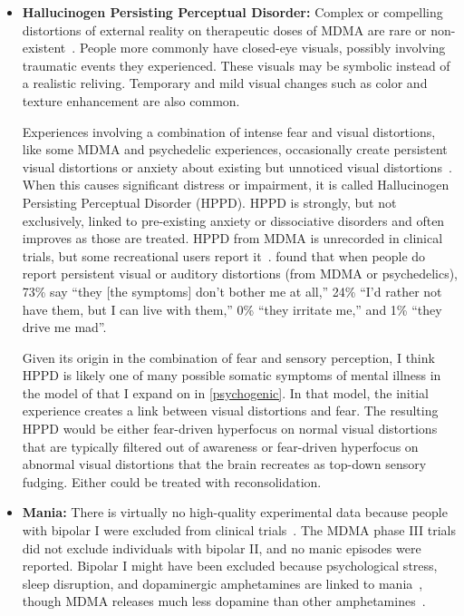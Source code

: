 \documentclass[11pt,oneside]{book}
\let\cite\parencite
\begin{document}
\begin{itemize}
    \item \textbf{Hallucinogen Persisting Perceptual Disorder:} Complex or compelling distortions of external reality on therapeutic doses of MDMA are rare or non-existent~\cite{liechtiGender}. People more commonly have closed-eye visuals, possibly involving traumatic events they experienced. These visuals may be symbolic instead of a realistic reliving. Temporary and mild visual changes such as color and texture enhancement are also common.

    Experiences involving a combination of intense fear and visual distortions, like some MDMA and psychedelic experiences, occasionally create persistent visual distortions or anxiety about existing but unnoticed visual distortions~\cite{halpernHPPD}. When this causes significant distress or impairment, it is called Hallucinogen Persisting Perceptual Disorder (HPPD). HPPD is strongly, but not exclusively, linked to pre-existing anxiety or dissociative disorders and often improves as those are treated. HPPD from MDMA is unrecorded in clinical trials, but some recreational users report it~\cite{vizeliActuteEffects,litjensHPPD}. \textcite[p. 289]{carhart2010user} found that when people do report persistent visual or auditory distortions (from MDMA or psychedelics), 73\% say \enquote{they [the symptoms] don't bother me at all,} 24\% \enquote{I'd rather not have them, but I can live with them,} 0\% \enquote{they irritate me,} and 1\% \enquote{they drive me mad}.

    Given its origin in the combination of fear and sensory perception, I think HPPD is likely one of many possible somatic symptoms of mental illness in the model of \textcite{berghPsychogenic} that I expand on in \cref{psychogenic}. In that model, the initial experience creates a link between visual distortions and fear. The resulting HPPD would be either fear-driven hyperfocus on normal visual distortions that are typically filtered out of awareness or fear-driven hyperfocus on abnormal visual distortions that the brain recreates as top-down sensory fudging. Either could be treated with reconsolidation.

    \item \textbf{Mania:} There is virtually no high-quality experimental data because people with bipolar I were excluded from clinical trials~\cite{mitchellMDMAClinicalTrial2}. The MDMA phase III trials did not exclude individuals with bipolar II, and no manic episodes were reported. Bipolar I might have been excluded because psychological stress, sleep disruption, and dopaminergic amphetamines are linked to mania~\cite{salvadoreMania}, though MDMA releases much less dopamine than other amphetamines~\cite{kankaanpÄÄDopamine}.


\end{itemize}
\end{document}

